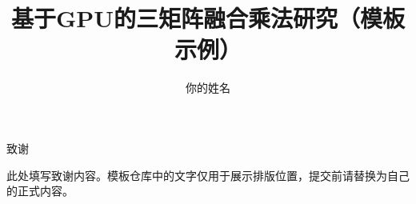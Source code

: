 \documentclass[UTF8,zihao=-4]{oucart}
\title{基于GPU的三矩阵融合乘法研究（模板示例）}
\author{你的姓名}
\begin{document}
    \makecover
    \makesignature
    \makeabstract

    \pagestyle{tableofcontents}
    \tableofcontents
    \clearpage
    \pagestyle{mainbody}

    \setcounter{page}{1}

    
    
    
    
    
    



    \newpage

    \begin{center}
        {\heiti 致谢}
    \end{center}

    此处填写致谢内容。模板仓库中的文字仅用于展示排版位置，提交前请替换为自己的正式内容。
\end{document}
